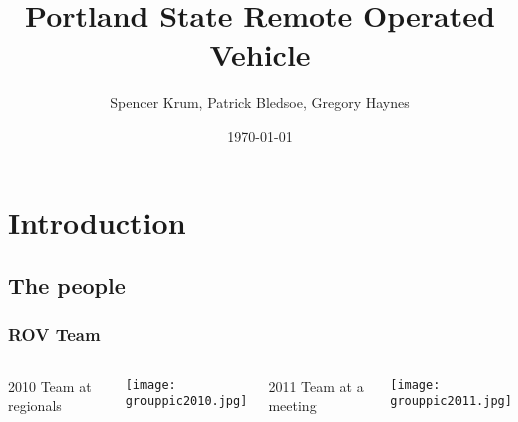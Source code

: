 \documentclass{beamer}
\title{Portland State Remote Operated Vehicle}
\date{\today}
\author{Spencer Krum, Patrick Bledsoe, Gregory Haynes}
\begin{document}
\frame{\titlepage}

\section{Introduction}
\subsection{The people}
\frame 
{
    \frametitle{ROV Team}
        \begin{columns}[c]
        \begin{center}
        2010 Team at regionals \\
        \end{center}
        \texttt{[image: grouppic2010.jpg]}
        
        \begin{center}
        2011 Team at a meeting \\
        \end{center}
        \texttt{[image: grouppic2011.jpg]}
        \end{columns}
}
\end{document}
